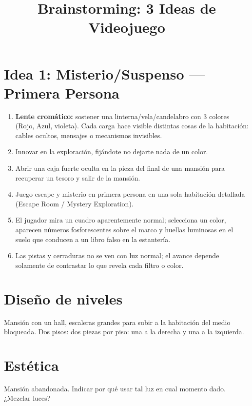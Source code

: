 \documentclass[11pt]{article}
\title{Brainstorming: 3 Ideas de Videojuego}
\author{}
\date{}
\begin{document}
\maketitle

\section{Idea 1: Misterio/Suspenso — Primera Persona}

\begin{enumerate}[label=\arabic*)]
    \item \textbf{Lente cromático:} sostener una linterna/vela/candelabro con 3 colores (Rojo, Azul, violeta). Cada carga hace visible distintas cosas de la habitación: cables ocultos, mensajes o mecanismos invisibles.

    \item Innovar en la exploración, fijándote no dejarte nada de un color.

    \item Abrir una caja fuerte oculta en la pieza del final de una mansión para recuperar un tesoro y salir de la mansión.

    \item Juego escape y misterio en primera persona en una sola habitación detallada (Escape Room / Mystery Exploration).

    \item El jugador mira un cuadro aparentemente normal; selecciona un color, aparecen números fosforescentes sobre el marco y huellas luminosas en el suelo que conducen a un libro falso en la estantería.

    \item Las pistas y cerraduras no se ven con luz normal; el avance depende solamente de contrastar lo que revela cada filtro o color.
\end{enumerate}

\section*{Diseño de niveles}
Mansión con un hall, escaleras grandes para subir a la habitación del medio bloqueada. Dos pisos: dos piezas por piso: una a la derecha y una a la izquierda.

\section*{Estética}
Mansión abandonada. Indicar por qué usar tal luz en cual momento dado. ¿Mezclar luces?
\end{document}
